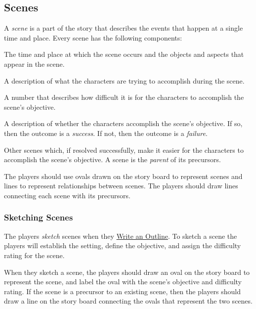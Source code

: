 \documentclass[12pt, a5paper, parskip=half-]{scrartcl}
\begin{document}
\subsection*{Scenes} \label{subsection:scenes}
A \emph{scene} is a part of the story that describes the events that happen at a single time and place.
Every scene has the following components:
\begin{description}[labelindent=0.25cm, leftmargin=\widthof{\hspace{0.25cm}\textbullet\space}, font=\normalfont\textbullet\bfseries\space]
  \item[Setting:]
  The time and place at which the scene occurs and the objects and aspects that appear in the scene.
  \item[Objective:]
    A description of what the characters are trying to accomplish during the scene.
  \item[Difficulty Rating:]
    A number that describes how difficult it is for the characters to accomplish the scene's objective.
  \item[Outcome:]
    A description of whether the characters accomplish the scene's objective. If so, then the outcome is a \emph{success}.  If not, then the outcome is a \emph{failure}.
  \item[Precursors:]
    Other scenes which, if resolved successfully, make it easier for the characters to accomplish the scene's objective.
    A scene is the \emph{parent} of its precursors.
\end{description} 

\bigskip

The players should use ovals drawn on the story board to represent scenes and lines to represent relationships between scenes.
The players should draw lines connecting each scene with its precursors.

\newpage

\subsubsection*{Sketching Scenes} \label{subsubsection:sketching-scenes}
The players \emph{sketch} scenes when they \hyperref[subsection:write-an-outline]{\cinzel \small Write an Outline}. 
To sketch a scene the players will establish the setting, define the objective, and assign the difficulty rating for the scene.

When they sketch a scene, the players should draw an oval on the story board to represent the scene, and label the oval with the scene's objective and difficulty rating.
If the scene is a precursor to an existing scene, then the players should draw a line on the story board connecting the ovals that represent the two scenes.
\end{document}
